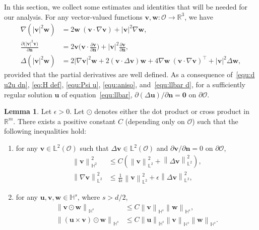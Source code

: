 \documentclass[11pt, reqno]{amsart}
\theoremstyle{definition}
\newtheorem{lemma}[theorem]{Lemma}
\numberwithin{equation}{section}
\newcommand{\bff}{\boldsymbol}
\newcommand{\bb}{\mathbb}
\newcommand{\norm}[2]{\left\|{#1}\right\|_{#2}}
\begin{document}
In this section, we collect some estimates and identities that will be needed for our analysis.
For any vector-valued functions $\bff{v},\bff{w}:\mathscr{O}\to\bb{R}^3$, we have
	\begin{align}
		\label{equ:nab un2}
		\nabla (|\bff{v}|^2 \bff{w}) 
		&= 
		2 \bff{w} \ (\bff{v}\cdot \nabla\bff{v}) 
		+ |\bff{v}|^2 \nabla \bff{w},
		\\
		\label{equ:d u2u dn}
		\frac{\partial\big(|\bff{v}|^2\bff{v}\big)}{\partial\bff{n}}
		&=
		2 \bff{v} \Big(\bff{v}\cdot \frac{\partial\bff{v}}{\partial\bff{n}}\Big)
		+
		|\bff{v}|^2 \frac{\partial\bff{v}}{\partial\bff{n}},
		\\
		\label{equ:del v2v}
		\Delta (|\bff{v}|^2 \bff{w}) 
		&= 
		2|\nabla \bff{v}|^2 \bff{w} 
		+ 2(\bff{v}\cdot \Delta \bff{v})\bff{w} 
		+ 4 \nabla \bff{w} \ (\bff{v}\cdot \nabla\bff{v})^\top
		+ |\bff{v}|^2 \Delta \bff{w}, 
	\end{align}
	provided that the partial derivatives are well defined. As a consequence of~\eqref{equ:d u2u dn}, \eqref{eq:H def}, \eqref{equ:Psi u}, \eqref{equ:aniso},  and~\eqref{equ:llbar d}, for a sufficiently regular solution $\bff{u}$ of equation~\eqref{equ:llbar}, $\partial(\Delta\bff{u})/\partial \bff{n}= \bff{0}$ on $\partial \mathscr{O}$.


\begin{lemma}
	Let $\epsilon>0$. Let $\odot$ denotes either the dot product or cross product in $\mathbb R^m$. There exists a positive constant $C$ (depending only on $\mathscr{O}$) such that the following
	inequalities hold:
	\begin{enumerate}
		\renewcommand{\labelenumi}{\theenumi}
		\renewcommand{\theenumi}{{\rm (\roman{enumi})}}
		\item for any $\bff{v}\in \bb{L}^2(\mathscr{O})$ such that $\Delta \bff{v}\in \bb{L}^2(\mathscr{O})$ and $\partial\bff{v}/\partial \bff{n}=0$ on $\partial \mathscr{O}$,
		\begin{align}
			\label{equ:v H2}
			\norm{\bff{v}}{\bb{H}^2}^2 
			&\leq 
			C \left( \norm{\bff{v}}{\bb{L}^2}^2 + \norm{\Delta \bff{v}}{\bb{L}^2}^2 \right),  
			\\
			\label{equ:nabla v L2}
			\norm{\nabla \bff{v}}{\bb{L}^2}^2 
			&\leq \frac{1}{4\epsilon} \norm{\bff{v}}{\bb{L}^2}^2 + \epsilon \norm{\Delta \bff{v}}{\bb{L}^2}^2,
		\end{align}
		
		\item for any $\bff{u},\bff{v},\bff{w} \in \bb{H}^s$, where $s>d/2$,
		\begin{align}
			\label{equ:prod Hs mat dot}
			\norm{\bff{v} \odot \bff{w}}{\bb{H}^s}
			&\leq
			C \norm{\bff{v}}{\bb{H}^s}
			\norm{\bff{w}}{\bb{H}^s},
			\\
			\label{equ:prod Hs triple}
			\norm{(\bff{u} \times \bff{v}) \odot \bff{w}}{\bb{H}^s}
			&\leq
			C \norm{\bff{u}}{\bb{H}^s} \norm{\bff{v}}{\bb{H}^s} \norm{\bff{w}}{\bb{H}^s}.
		\end{align}
	\end{enumerate}
\end{lemma}
\end{document}
